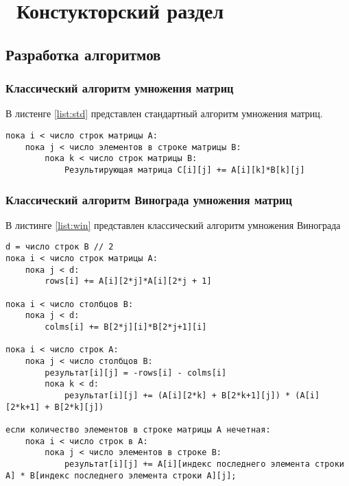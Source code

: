 \chapter{ Констукторский раздел}
\label{cha:design}
\section{ Разработка алгоритмов}

\subsection{ Классический алгоритм умножения матриц}
В листенге \ref{list:std} представлен стандартный алгоритм умножения матриц.

\begin{lstlisting}[caption={Pseudocode of classic matrix multiplication}, label={list:std}]
пока i < число строк матрицы А:
	пока j < число элементов в строке матрицы B:
        пока k < число строк матрицы B:
		    Результирующая матрица C[i][j] += A[i][k]*B[k][j]
\end{lstlisting}	



\subsection{ Классический алгоритм Винограда умножения матриц}
В листинге \ref{list:win} представлен классический алгоритм умножения Винограда

\begin{lstlisting}[caption={Pseudocode of classic Winograd algorithm}, label={list:win}]
d = число строк B // 2
пока i < число строк матрицы А:
	пока j < d:
		rows[i] += A[i][2*j]*A[i][2*j + 1]

пока i < число столбцов B:
	пока j < d:
		colms[i] += B[2*j][i]*B[2*j+1][i]

пока i < число строк A:
	пока j < число cтолбцов B:
        результат[i][j] = -rows[i] - colms[i]
        пока k < d:
            результат[i][j] += (A[i][2*k] + B[2*k+1][j]) * (A[i][2*k+1] + B[2*k][j])

если количество элементов в строке матрицы A нечетная:
    пока i < число строк в A:
        пока j < число элементов в строке B:
            результат[i][j] += A[i][индекс последнего элемента строки A] * B[индекс последнего элемента строки A][j];
\end{lstlisting}	



